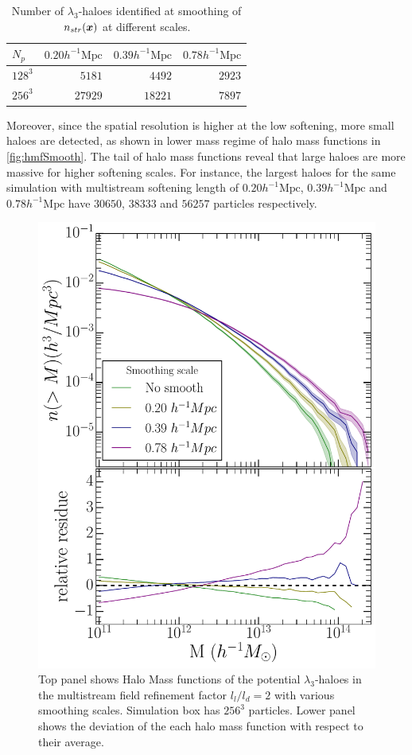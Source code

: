 \documentclass[fleqn,usenatbib,useAMS]{mnras}
\begin{document}
{\begin{table}
  \caption{Number of $\lambda_3$-haloes identified at smoothing of $n_{str}(\bmath{x})$ at different scales.}
\begin{tabular}{|l|r|r|r|}
\hline
$N_p$  &  $0.20h^{-1} \text{Mpc}$ & $0.39 h^{-1} \text{Mpc}$ & $0.78 h^{-1} \text{Mpc}$ \\ \hline
$128^3$   & $5181$  &  $4492$ & $2923$ \\ \hline
$256^3$   & $27929$  & $18221$ & $7897$ \\ \hline

\end{tabular}
\label{tab:HaloesSmooth}
\end{table}


Moreover, since the spatial resolution is higher at the low softening, more small haloes are detected, as shown in lower mass regime of halo mass functions in \autoref{fig:hmfSmooth}. The tail of halo mass functions reveal that large haloes are more massive for higher softening scales. For instance, the largest haloes for the same simulation with multistream softening length of $0.20 h^{-1} \text{Mpc}$, $0.39 h^{-1} \text{Mpc}$ and $0.78 h^{-1} \text{Mpc}$ have $30650$, $38333$ and $56257$ particles respectively. 

\begin{figure}
\begin{minipage}[t]{.99\linewidth}
 \centering\includegraphics[width=8.cm]{fig6.pdf} 
\end{minipage}\hfill
\caption{Top panel shows Halo Mass functions of the potential $\lambda_3$-haloes in the multistream field refinement factor $l_l/l_d = 2$ with various smoothing scales. Simulation box has $256^3$ particles. Lower panel shows the deviation of the each halo mass function with respect to their average.}
\label{fig:hmfSmooth}
\end{figure}

}
\end{document}
